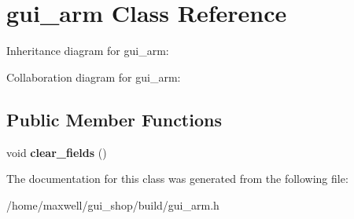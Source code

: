 \hypertarget{classgui__arm}{}\section{gui\+\_\+arm Class Reference}
\label{classgui__arm}


Inheritance diagram for gui\+\_\+arm\+:


Collaboration diagram for gui\+\_\+arm\+:
\subsection*{Public Member Functions}
\begin{DoxyCompactItemize}
\item 
void {\bfseries clear\+\_\+fields} ()\hypertarget{classgui__arm_aede8c24a2cf91730d6466e837bd9ece1}{}\label{classgui__arm_aede8c24a2cf91730d6466e837bd9ece1}

\end{DoxyCompactItemize}


The documentation for this class was generated from the following file\+:\begin{DoxyCompactItemize}
\item 
/home/maxwell/gui\+\_\+shop/build/gui\+\_\+arm.\+h\end{DoxyCompactItemize}
